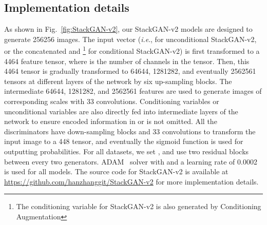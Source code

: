 \documentclass[10pt,journal,letterpaper,compsoc]{IEEEtran}
\begin{document}
\subsection{Implementation details}

As shown in Fig.~\ref{fig:StackGAN-v2}, our StackGAN-v2 models are designed to generate 256256 images. 
The input vector (\emph{i.e}.,  for unconditional StackGAN-v2, or the concatenated  and \footnote{The conditioning variable  for StackGAN-v2 is also generated by Conditioning Augmentation} for conditional StackGAN-v2) is first transformed to a 4464 feature tensor, where  is the number of channels in the tensor. Then, this 4464 tensor is gradually transformed to 64644, 1281282, and eventually 2562561 tensors at different layers of the network by six up-sampling blocks. The intermediate 64644, 1281282, and 2562561 features are used to generate images of corresponding scales with 33 convolutions. Conditioning variables  or unconditional variables  are also directly fed into intermediate layers of the network to ensure encoded information in  or  is not omitted. All the discriminators  have down-sampling blocks and 33 convolutions to transform the input image to a 448 tensor, and eventually the sigmoid function is used for outputting probabilities.  For all datasets, we set ,  and use two residual blocks between every two generators. ADAM~\cite{KingmaB14} solver with  and a learning rate of 0.0002 is used for all models. The source code for StackGAN-v2 is available at {\href{https://github.com/hanzhanggit/StackGAN-v2}{https://github.com/hanzhanggit/StackGAN-v2}} for more implementation details.
\end{document}
